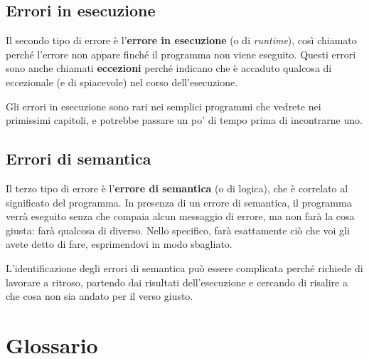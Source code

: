 \documentclass[10pt]{book}
\begin{document}
\subsection{Errori in esecuzione}
\label{runtime}

Il secondo tipo di errore è l'{\bf errore in esecuzione} (o di {\em runtime}), così chiamato perché l'errore non appare finché il programma non viene eseguito. Questi errori sono anche chiamati {\bf eccezioni} perché indicano che è accaduto qualcosa di eccezionale (e di spiacevole) nel corso dell'esecuzione.

Gli errori in esecuzione sono rari nei semplici programmi che vedrete nei primissimi capitoli, e potrebbe passare un po' di tempo prima di incontrarne uno.


\subsection{Errori di semantica}

Il terzo tipo di errore è l'{\bf errore di semantica} (o di logica), che è correlato al significato del programma. In presenza di un errore di semantica, il programma verrà eseguito senza che compaia alcun messaggio di errore, ma non farà la cosa giusta: farà qualcosa di diverso. Nello specifico, farà esattamente ciò che voi gli avete detto di fare, esprimendovi in modo sbagliato.

L'identificazione degli errori di semantica può essere complicata perché richiede di lavorare a ritroso, partendo dai risultati dell'esecuzione e cercando di risalire a che cosa non sia andato per il verso giusto.


\section{Glossario}
\end{document}
